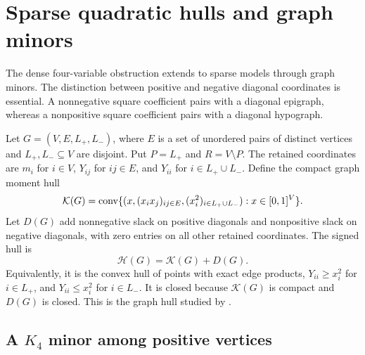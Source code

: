 \section{Sparse quadratic hulls and graph minors}
\label{graph:section}

The dense four-variable obstruction extends to sparse models through graph
minors. The distinction between positive and negative diagonal coordinates
is essential. A nonnegative square coefficient pairs with a diagonal
epigraph, whereas a nonpositive square coefficient pairs with a diagonal
hypograph.

Let $G=(V,E,L_+,L_-)$, where $E$ is a set of unordered pairs of distinct
vertices and $L_+,L_-\subseteq V$ are disjoint. Put $P=L_+$ and $R=V\setminus P$.
The retained coordinates are $m_i$ for $i\in V$, $Y_{ij}$ for $ij\in E$,
and $Y_{ii}$ for $i\in L_+\cup L_-$. Define the compact graph moment hull
\[
 \mathcal K(G)=\operatorname{conv}\{(x,(x_ix_j)_{ij\in E},
                         (x_i^2)_{i\in L_+\cup L_-}):x\in[0,1]^V\}.
\]
Let $D(G)$ add nonnegative slack on positive diagonals and nonpositive
slack on negative diagonals, with zero entries on all other retained
coordinates. The signed hull is
\begin{equation}\label{graph:signed-hull}
 \mathcal H(G)=\mathcal K(G)+D(G).
\end{equation}
Equivalently, it is the convex hull of points with exact edge products,
$Y_{ii}\geq x_i^2$ for $i\in L_+$, and $Y_{ii}\leq x_i^2$ for
$i\in L_-$. It is closed because $\mathcal K(G)$ is compact and $D(G)$ is
closed. This is the graph hull studied by \citet{Khajavirad2026SparseBoxQP}.

\subsection{A \texorpdfstring{$K_4$}{K4} minor among positive vertices}

